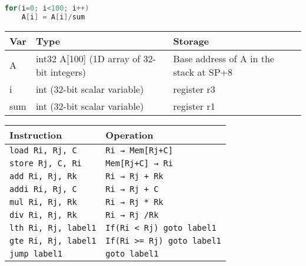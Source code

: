 \documentclass[docid=2020]{comp_test2}
\begin{document}
\setcounter{chapter}{2020}


\begin{lstlisting}[language=c++, caption=Code1]
for(i=0; i<100; i++)
    A[i] = A[i]/sum
\end{lstlisting}

\noindent
\begin{minipage}[t]{0.45\textwidth}
    \begin{center}
        \begin{tabular}{| l | p{28mm} | p{24mm} |}
            \hline
            \textbf{Var} & \textbf{Type} & \textbf{Storage} \\ \hline
            A & int32 A[100] (1D array of 32-bit integers) & Base address of A in the stack at SP+8 \\ \hline
            i & int (32-bit scalar variable) & register r3 \\ \hline
            sum & int (32-bit scalar variable) & register r1 \\ \hline
        \end{tabular}
    \end{center}
\end{minipage}
\begin{minipage}[t]{0.539\textwidth}
    \small
    \begin{center}
        \begin{tabular}{| l | l |}
            \hline
            \textbf{Instruction} & \textbf{Operation} \\ \hline
            \texttt{load Ri, Rj, C    } & \texttt{Ri → Mem[Rj+C]          } \\ \hline
            \texttt{store Rj, C, Ri   } & \texttt{Mem[Rj+C] → Ri          } \\ \hline
            \texttt{add Ri, Rj, Rk    } & \texttt{Ri → Rj + Rk            } \\ \hline
            \texttt{addi Ri, Rj, C    } & \texttt{Ri → Rj + C             } \\ \hline
            \texttt{mul Ri, Rj, Rk    } & \texttt{Ri → Rj * Rk            } \\ \hline
            \texttt{div Ri, Rj, Rk    } & \texttt{Ri → Rj /Rk             } \\ \hline
            \texttt{lth Ri, Rj, label1} & \texttt{If(Ri < Rj) goto label1 } \\ \hline
            \texttt{gte Ri, Rj, label1} & \texttt{If(Ri >= Rj) goto label1} \\ \hline
            \texttt{jump label1       } & \texttt{goto label1             } \\ \hline
        \end{tabular}
    \end{center}
\end{minipage}
\end{document}
